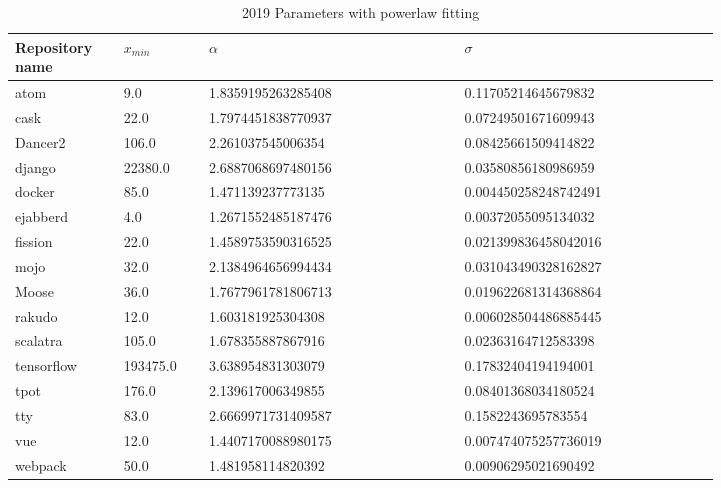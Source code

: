 \documentclass[conference]{IEEEtran}
\begin{document}
\begin{table}[htbp]
	\caption{2019 Parameters with powerlaw fitting}
	\begin{center}
		\begin{tabular}{| p{0.12\linewidth} | p{0.1\linewidth} | p{0.3\linewidth} | p{0.3\linewidth} |}
	\hline
	Repository name &$x_{min}$ & $\alpha$ & $\sigma$\\
	\hline
atom  &9.0  &1.8359195263285408  &0.11705214645679832 \\
cask  &22.0   &1.7974451838770937  &0.07249501671609943 \\
Dancer2  &106.0   &2.261037545006354  &0.08425661509414822 \\
django  &22380.0   &2.6887068697480156  &0.03580856180986959\\
docker  &85.0  &1.471139237773135  &0.004450258248742491 \\
ejabberd  &4.0   &1.2671552485187476  &0.00372055095134032 \\
fission  &22.0   &1.4589753590316525  &0.021399836458042016\\ 
mojo  &32.0   &2.1384964656994434  &0.031043490328162827 \\
Moose  &36.0   &1.7677961781806713  &0.019622681314368864 \\
rakudo  &12.0   &1.603181925304308  &0.006028504486885445 \\
scalatra  &105.0  &1.678355887867916  &0.02363164712583398 \\
tensorflow  &193475.0  &3.638954831303079  &0.17832404194194001 \\
tpot  &176.0   &2.139617006349855  &0.08401368034180524 \\
tty  &83.0   &2.6669971731409587  &0.1582243695783554 \\
vue  &12.0   &1.4407170088980175  &0.007474075257736019 \\
webpack &50.0  &1.481958114820392  &0.00906295021690492 \\
			\hline
		\end{tabular}
	\end{center}
\label{tab:2019pars}
\end{table}
\end{document}
